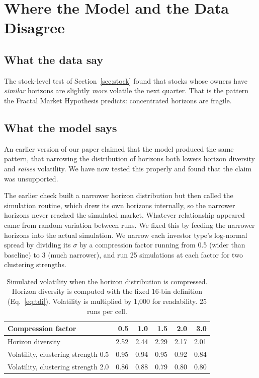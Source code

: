 \section{Where the Model and the Data Disagree}
\label{sec:tension}

\subsection{What the data say}

The stock-level test of Section~\ref{sec:stock} found that stocks whose owners have \emph{similar} horizons are slightly \emph{more} volatile the next quarter. That is the pattern the Fractal Market Hypothesis predicts: concentrated horizons are fragile.

\subsection{What the model says}

An earlier version of our paper claimed that the model produced the same pattern, that narrowing the distribution of horizons both lowers horizon diversity and \emph{raises} volatility. We have now tested this properly and found that the claim was unsupported.

The earlier check built a narrower horizon distribution but then called the simulation routine, which drew its own horizons internally, so the narrower horizons never reached the simulated market. Whatever relationship appeared came from random variation between runs. We fixed this by feeding the narrower horizons into the actual simulation. We narrow each investor type's log-normal spread by dividing its $\sigma$ by a compression factor running from 0.5 (wider than baseline) to 3 (much narrower), and run 25 simulations at each factor for two clustering strengths.

\begin{table}[htbp]
\centering
\caption{Simulated volatility when the horizon distribution is compressed. Horizon diversity is computed with the fixed 16-bin definition (Eq.~\eqref{eq:tdi}). Volatility is multiplied by 1{,}000 for readability. 25 runs per cell.}
\label{tab:conc}
\begin{tabular}{lrrrrr}
\toprule
Compression factor & 0.5 & 1.0 & 1.5 & 2.0 & 3.0\\
\midrule
Horizon diversity & 2.52 & 2.44 & 2.29 & 2.17 & 2.01\\
Volatility, clustering strength 0.5 & 0.95 & 0.94 & 0.95 & 0.92 & 0.84\\
Volatility, clustering strength 2.0 & 0.86 & 0.88 & 0.79 & 0.80 & 0.80\\
\bottomrule
\end{tabular}
\end{table}

